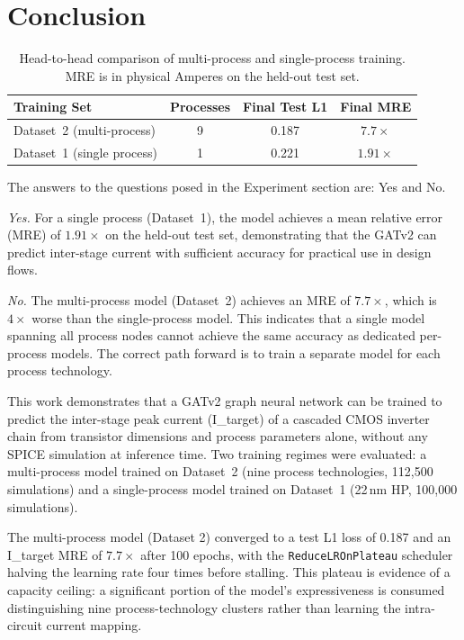 \documentclass[10pt,twocolumn,letterpaper]{article}
\begin{document}
\section{Conclusion}
\label{sec:conclusion}

\begin{table}[tp]
\centering
\captionsetup{justification=centering}
\begin{tabular}{|l|c|c|c|}
\hline
\textbf{Training Set} & \textbf{Processes} & \textbf{Final Test L1} & \textbf{Final MRE} \\
\hline
Dataset~2 (multi-process) & 9 & 0.187 & $7.7\times$ \\
Dataset~1 (single process) & 1 & 0.221 & $\mathbf{1.91\times}$ \\
\hline
\end{tabular}
\caption{Head-to-head comparison of multi-process and single-process training.\\MRE is in physical Amperes on the held-out test set.}
\label{tab:comparison}
\end{table}

The answers to the questions posed in the Experiment section are: Yes and No.

\textit{Yes.} For a single process (Dataset~1), the model achieves a mean relative error (MRE) of $1.91\times$ on the held-out test set, demonstrating that the GATv2 can predict inter-stage current with sufficient accuracy for practical use in design flows.

\textit{No.} The multi-process model (Dataset~2) achieves an MRE of $7.7\times$, which is $4\times$ worse than the single-process model. This indicates that a single model spanning all process nodes cannot achieve the same accuracy as dedicated per-process models. The correct path forward is to train a separate model for each process technology.

This work demonstrates that a GATv2 graph neural network can be trained to predict the inter-stage peak current (I\_target) of a cascaded CMOS inverter chain from transistor dimensions and process parameters alone, without any SPICE simulation at inference time. Two training regimes were evaluated: a multi-process model trained on Dataset~2 (nine process technologies, 112,500 simulations) and a single-process model trained on Dataset~1 (22\,nm HP, 100,000 simulations).

The multi-process model (Dataset 2) converged to a test L1 loss of 0.187 and an I\_target MRE of $7.7\times$ after 100 epochs, with the \texttt{ReduceLROnPlateau} scheduler halving the learning rate four times before stalling. This plateau is evidence of a capacity ceiling: a significant portion of the model's expressiveness is consumed distinguishing nine process-technology clusters rather than learning the intra-circuit current mapping.
\end{document}
